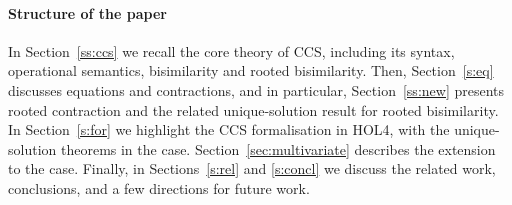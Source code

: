 \paragraph{Structure of the paper}

In Section~\ref{ss:ccs} we recall the core theory of CCS,
including its syntax, operational semantics, bisimilarity and rooted
bisimilarity.
Then, Section~\ref{s:eq} discusses equations and contractions, and in particular,
Section~\ref{ss:new} presents rooted contraction and the related
unique-solution result for rooted bisimilarity.
In Section~\ref{s:for} we highlight the CCS formalisation in HOL4, with
the unique-solution theorems in the \univariate case.
Section~\ref{sec:multivariate} describes the extension to the \multivariate case.
Finally, in Sections~\ref{s:rel} and \ref{s:concl} we discuss the related work, %
conclusions, and a few directions for future work.

